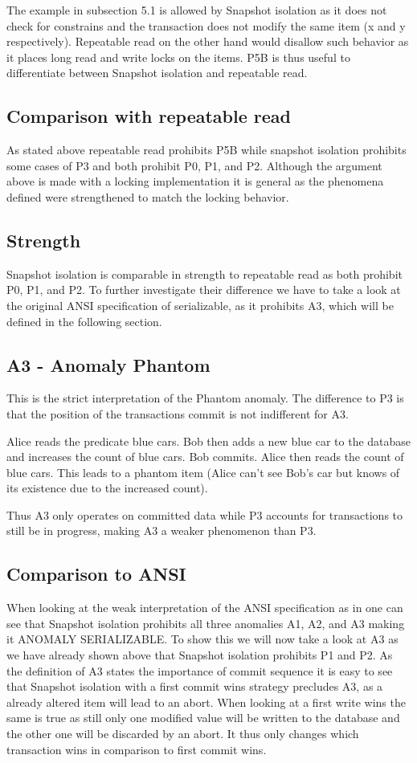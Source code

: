 \documentclass[sigconf, review=true]{acmart}
\begin{document}
The example in subsection 5.1 is allowed by Snapshot isolation as it does not check for constrains and the transaction
does not modify the same item (x and y respectively). Repeatable read on the other hand would disallow such
behavior as it places long read and write locks on the items.
P5B is thus useful to differentiate between Snapshot isolation and repeatable read.
\subsection{Comparison with repeatable read}
As stated above repeatable read prohibits P5B while snapshot isolation prohibits some cases of
P3 and both prohibit P0, P1, and P2. Although the argument above is made with a locking implementation
it is general as the phenomena defined were strengthened to match the locking behavior.
\subsection{Strength}
Snapshot isolation is comparable in strength to repeatable read as both prohibit P0, P1, and P2.
To further investigate their difference we have to take a look at the original ANSI specification of serializable,
as it prohibits A3, which will be defined in the following section.
\subsection{A3 - Anomaly Phantom}
This is the strict interpretation of the Phantom anomaly. The difference to P3 is that the position of the
transactions commit is not indifferent for A3.
\begin{example}
    Alice reads the predicate blue cars. Bob then adds a new blue car to the database and increases
    the count of blue cars. Bob commits.  Alice then reads the count of blue cars. This leads to a phantom item
    (Alice can’t see Bob's car but knows of its existence due to the increased count).
\end{example}
Thus A3 only operates on committed data while P3 accounts for transactions to still be in progress,
making A3 a weaker phenomenon than P3.
\subsection{Comparison to ANSI}
When looking at the weak interpretation of the ANSI specification as in \cite{Adya_Liskov_O_Neil_2000}
one can see that Snapshot isolation prohibits all three anomalies A1, A2, and A3 making it ANOMALY SERIALIZABLE.
To show this we will now take a look at A3 as we have already shown above that Snapshot isolation prohibits P1 and P2.
As the definition of A3 states the importance of commit sequence it is easy to see that Snapshot isolation with a first commit wins
strategy precludes A3, as a already altered item will lead to an abort.
When looking at a first write wins the same is true as still only one modified value will
be written to the database and the other one will be discarded by an abort. It thus only changes
which transaction wins in comparison to first commit wins.
\end{document}
